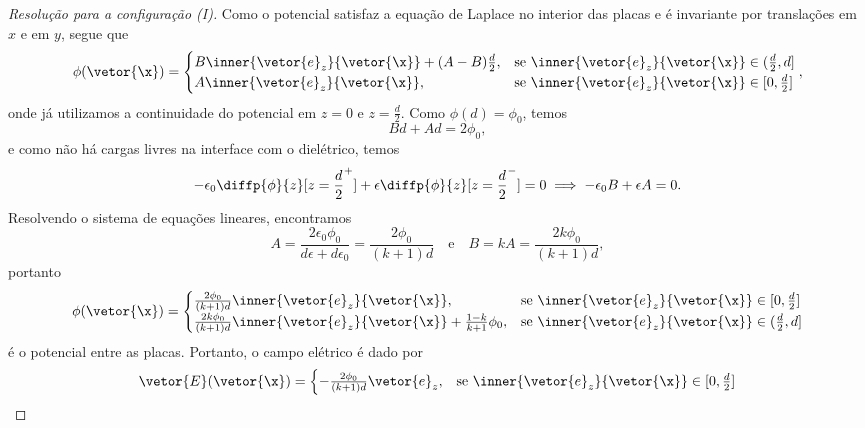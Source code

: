 \begin{proof}[Resolução para a configuração (I)]
    Como o potencial satisfaz a equação de Laplace no interior das placas e é invariante por translações em \(x\) e em \(y\), segue que
    \begin{equation*}
        \phi(\vetor{\x})=\begin{cases}
            B\inner{\vetor{e}_z}{\vetor{\x}} + (A-B)\frac{d}{2},&\text{se }\inner{\vetor{e}_z}{\vetor{\x}} \in (\frac{d}{2}, d]\\
            A\inner{\vetor{e}_z}{\vetor{\x}},&\text{se }\inner{\vetor{e}_z}{\vetor{\x}} \in [0,\frac{d}{2}]
        \end{cases},
    \end{equation*}
    onde já utilizamos a continuidade do potencial em \(z = 0\) e \(z = \frac{d}{2}\). Como \(\phi(d) = \phi_0\), temos
    \begin{equation*}
        Bd + Ad= 2\phi_0,
    \end{equation*}
    e como não há cargas livres na interface com o dielétrico, temos
    \begin{equation*}
        -\epsilon_0 \diffp{\phi}{z}[z=\frac{d}{2}^+] + \epsilon \diffp{\phi}{z}[z=\frac{d}{2}^-] = 0 \implies -\epsilon_0 B + \epsilon A = 0.
    \end{equation*}
    Resolvendo o sistema de equações lineares, encontramos
    \begin{equation*}
        A = \frac{2\epsilon_0 \phi_0}{d \epsilon + d \epsilon_0} = \frac{2 \phi_0}{(k + 1)d} \quad\text{e}\quad B = k A = \frac{2 k \phi_0}{(k + 1)d},
    \end{equation*}
    portanto
    \begin{equation*}
        \phi(\vetor{\x}) = \begin{cases}
            \frac{2\phi_0}{(k+1)d}\inner{\vetor{e}_z}{\vetor{\x}},&\text{se }\inner{\vetor{e}_z}{\vetor{\x}} \in [0,\frac{d}{2}]\\
            \frac{2k \phi_0}{(k+1)d}\inner{\vetor{e}_z}{\vetor{\x}} + \frac{1-k}{k+1}\phi_0, &\text{se }\inner{\vetor{e}_z}{\vetor{\x}} \in (\frac{d}{2},d]
        \end{cases}
    \end{equation*}
    é o potencial entre as placas. Portanto, o campo elétrico é dado por
    \begin{equation*}
        \vetor{E}(\vetor{\x}) = \begin{cases}
            -\frac{2\phi_0}{(k+1)d}\vetor{e}_z,&\text{se }\inner{\vetor{e}_z}{\vetor{\x}}\in [0,\frac{d}{2}]\\

\end{cases}
\end{equation*}
\end{proof}
